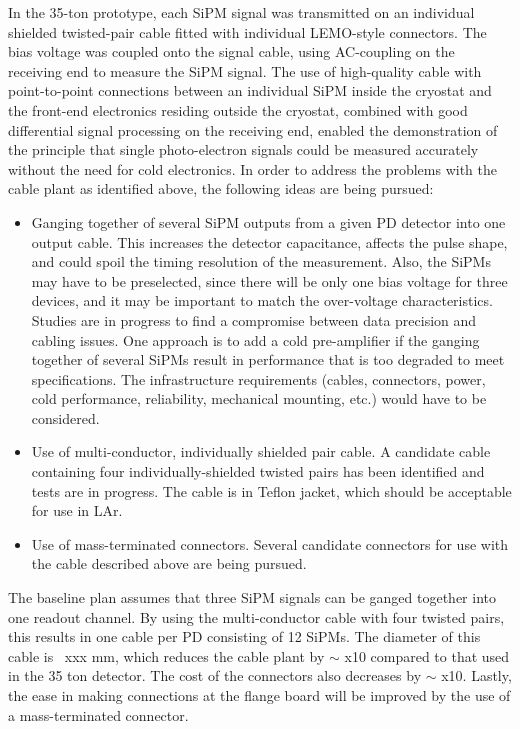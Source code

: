 In the 35-ton prototype, each SiPM signal was transmitted on an
individual shielded twisted-pair cable fitted with individual
LEMO-style connectors.  The bias voltage was coupled onto the signal
cable, using AC-coupling on the receiving end to measure the SiPM
signal.  The use of high-quality cable with point-to-point connections
between an individual SiPM inside the cryostat and the front-end
electronics residing outside the cryostat, combined with good
differential signal processing on the receiving end, enabled the
demonstration of the principle that single photo-electron signals
could be measured accurately without the need for cold electronics.
In order to address the problems with the cable plant as identified
above, the following ideas are being pursued:
\begin{itemize}
\item Ganging together of several SiPM outputs from a given PD
  detector into one output cable.  This increases the detector
  capacitance, affects the pulse shape, and could spoil the timing
  resolution of the measurement.  Also, the SiPMs may have to be
  preselected, since there will be only one bias voltage for three
  devices, and it may be important to match the over-voltage
  characteristics.  Studies are in progress to find a compromise
  between data precision and cabling issues. One approach is to add a
  cold pre-amplifier if the ganging together of several SiPMs result
  in performance that is too degraded to meet specifications.  The
  infrastructure requirements (cables, connectors, power, cold
  performance, reliability, mechanical mounting, etc.) would have to
  be considered.

\item Use of multi-conductor, individually shielded pair cable.  A
  candidate cable containing four individually-shielded twisted pairs
  has been identified and tests are in progress.  The cable is in
  Teflon jacket, which should be acceptable for use in LAr.

\item Use of mass-terminated connectors.  Several candidate connectors
  for use with the cable described above are being pursued.
\end{itemize}

The baseline plan assumes that three SiPM signals can be ganged
together into one readout channel.  By using the multi-conductor cable
with four twisted pairs, this results in one cable per PD consisting
of 12 SiPMs.  The diameter of this cable is ~xxx mm, which reduces the
cable plant by $\sim$ x10 compared to that used in the 35 ton
detector.  The cost of the connectors also decreases by $\sim$ x10.
Lastly, the ease in making connections at the flange board will be
improved by the use of a mass-terminated connector.

